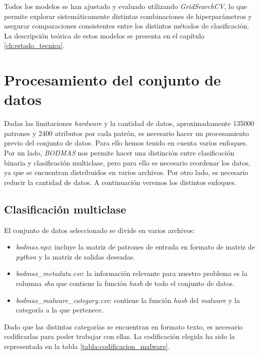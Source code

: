 Todos los modelos se han ajustado y evaluado utilizando \textit{GridSearchCV}, lo que permite explorar sistemáticamente distintas combinaciones de hiperparámetros y asegurar comparaciones consistentes entre los distintos métodos de clasificación. La descripción teórica de estos modelos se presenta en el capítulo \ref{ch:estado_tecnica}.


\section{Procesamiento del conjunto de datos}
\label{sec:proc_dataset}

Dadas las limitaciones \textit{hardware} y la cantidad de datos, aproximadamente 135000 patrones y 2400 atributos por cada patrón, es necesario hacer un procesamiento previo del conjunto de datos. Para ello hemos tenido en cuenta varios enfoques. Por un lado, \textit{BODMAS} nos permite hacer una distinción entre clasificación binaria y clasificación multiclase, pero para ello es necesario reordenar los datos, ya que se encuentran distribuidos en varios archivos. Por otro lado, es necesario reducir la cantidad de datos. A continuación veremos los distintos enfoques.

\newpage
\subsection{Clasificación multiclase}
\label{subsec:multiclass}

El conjunto de datos seleccionado se divide en varios archivos:

\begin{itemize}
	\item \textit{bodmas.npz}: incluye la matriz de patrones de entrada en formato de matriz de \textit{python} y la matriz de salidas deseadas.
	\item \textit{bodmas\_metadata.csv}: la información relevante para nuestro problema es la columna \textit{sha} que contiene la función \textit{hash} de todo el conjunto de datos.
	\item \textit{bodmas\_malware\_category.csv}: contiene la función \textit{hash} del \textit{malware} y la categoría a la que pertenece.
\end{itemize}

Dado que las distintas categorías se encuentran en formato texto, es necesario codificarlas para poder trabajar con ellas. La codificación elegida ha sido la representada en la tabla \ref{tabla:codificacion_malware}.

